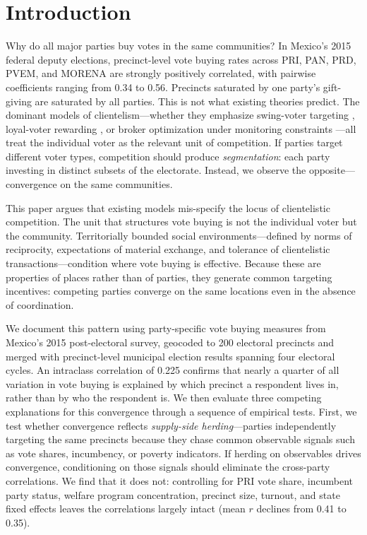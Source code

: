 \documentclass[12pt,letterpaper]{article}
\begin{document}
\newpage

\section{Introduction}

Why do all major parties buy votes in the same communities? In Mexico's 2015 federal deputy elections, precinct-level vote buying rates across PRI, PAN, PRD, PVEM, and MORENA are strongly positively correlated, with pairwise coefficients ranging from 0.34 to 0.56. Precincts saturated by one party's gift-giving are saturated by all parties. This is not what existing theories predict. The dominant models of clientelism---whether they emphasize swing-voter targeting \citep{stokes2005perverse, dixit1996determinants}, loyal-voter rewarding \citep{cox1986electoral, nichter2008vote}, or broker optimization under monitoring constraints \citep{stokes2013brokers, larreguy2016parties}---all treat the individual voter as the relevant unit of competition. If parties target different voter types, competition should produce \textit{segmentation}: each party investing in distinct subsets of the electorate. Instead, we observe the opposite---convergence on the same communities.

This paper argues that existing models mis-specify the locus of clientelistic competition. The unit that structures vote buying is not the individual voter but the community. Territorially bounded social environments---defined by norms of reciprocity, expectations of material exchange, and tolerance of clientelistic transactions---condition where vote buying is effective. Because these are properties of places rather than of parties, they generate common targeting incentives: competing parties converge on the same locations even in the absence of coordination.

We document this pattern using party-specific vote buying measures from Mexico's 2015 post-electoral survey, geocoded to 200 electoral precincts and merged with precinct-level municipal election results spanning four electoral cycles. An intraclass correlation of 0.225 confirms that nearly a quarter of all variation in vote buying is explained by which precinct a respondent lives in, rather than by who the respondent is. We then evaluate three competing explanations for this convergence through a sequence of empirical tests. First, we test whether convergence reflects \textit{supply-side herding}---parties independently targeting the same precincts because they chase common observable signals such as vote shares, incumbency, or poverty indicators. If herding on observables drives convergence, conditioning on those signals should eliminate the cross-party correlations. We find that it does not: controlling for PRI vote share, incumbent party status, welfare program concentration, precinct size, turnout, and state fixed effects leaves the correlations largely intact (mean $r$ declines from 0.41 to 0.35).
\end{document}
